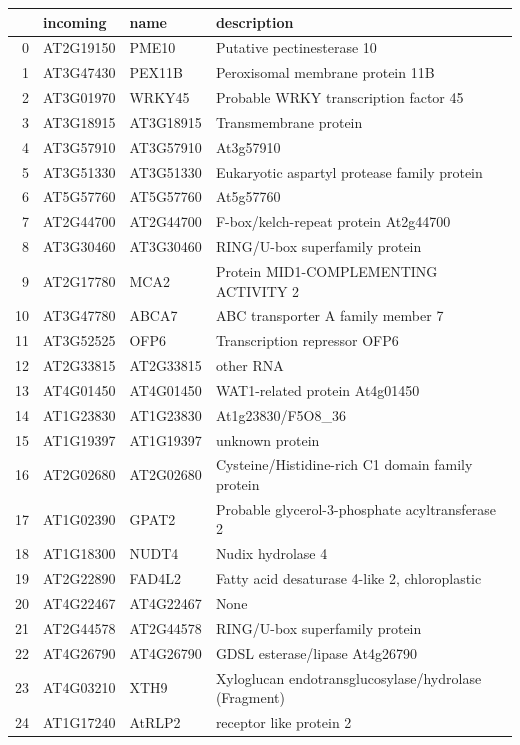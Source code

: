 \documentclass[11pt]{article}
\begin{document}
\begin{center}
\begin{tabular}{rlll}
 & incoming & name & description\\
\hline
0 & AT2G19150 & PME10 & Putative pectinesterase 10\\
1 & AT3G47430 & PEX11B & Peroxisomal membrane protein 11B\\
2 & AT3G01970 & WRKY45 & Probable WRKY transcription factor 45\\
3 & AT3G18915 & AT3G18915 & Transmembrane protein\\
4 & AT3G57910 & AT3G57910 & At3g57910\\
5 & AT3G51330 & AT3G51330 & Eukaryotic aspartyl protease family protein\\
6 & AT5G57760 & AT5G57760 & At5g57760\\
7 & AT2G44700 & AT2G44700 & F-box/kelch-repeat protein At2g44700\\
8 & AT3G30460 & AT3G30460 & RING/U-box superfamily protein\\
9 & AT2G17780 & MCA2 & Protein MID1-COMPLEMENTING ACTIVITY 2\\
10 & AT3G47780 & ABCA7 & ABC transporter A family member 7\\
11 & AT3G52525 & OFP6 & Transcription repressor OFP6\\
12 & AT2G33815 & AT2G33815 & other RNA\\
13 & AT4G01450 & AT4G01450 & WAT1-related protein At4g01450\\
14 & AT1G23830 & AT1G23830 & At1g23830/F5O8\_36\\
15 & AT1G19397 & AT1G19397 & unknown protein\\
16 & AT2G02680 & AT2G02680 & Cysteine/Histidine-rich C1 domain family protein\\
17 & AT1G02390 & GPAT2 & Probable glycerol-3-phosphate acyltransferase 2\\
18 & AT1G18300 & NUDT4 & Nudix hydrolase 4\\
19 & AT2G22890 & FAD4L2 & Fatty acid desaturase 4-like 2, chloroplastic\\
20 & AT4G22467 & AT4G22467 & None\\
21 & AT2G44578 & AT2G44578 & RING/U-box superfamily protein\\
22 & AT4G26790 & AT4G26790 & GDSL esterase/lipase At4g26790\\
23 & AT4G03210 & XTH9 & Xyloglucan endotransglucosylase/hydrolase (Fragment)\\
24 & AT1G17240 & AtRLP2 & receptor like protein 2\\

\end{tabular}
\end{center}
\end{document}
